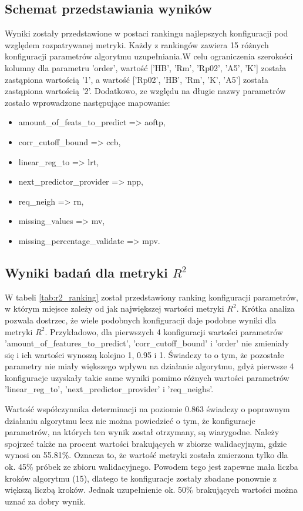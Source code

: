 \subsection{Schemat przedstawiania wyników}
Wyniki zostały przedstawione w postaci rankingu najlepszych konfiguracji pod względem rozpatrywanej metryki. Każdy z rankingów zawiera 15 różnych konfiguracji parametrów algorytmu uzupełniania.W celu ograniczenia szerokości kolumny dla parametru 'order',  wartość [’HB’, ’Rm’, ’Rp02’, ’A5’, ’K’] została zastąpiona wartością '1', a wartość  [’Rp02’, ’HB’, ’Rm’, ’K’, ’A5’] została zastąpiona wartością '2'.
Dodatkowo, ze względu na długie nazwy parametrów zostało wprowadzone następujące mapowanie:
\begin{itemize}
    \item amount\_of\_feats\_to\_predict => aoftp,
    \item corr\_cutoff\_bound => ccb,
    \item linear\_reg\_to => lrt,
    \item next\_predictor\_provider => npp,
    \item req\_neigh => rn,
    \item missing\_values => mv,
    \item missing\_percentage\_validate => mpv.
\end{itemize}

\subsection{\texorpdfstring{Wyniki badań dla metryki $R^{2}$}{Wyniki badań dla metryki R2}}
W tabeli \ref{tab:r2_ranking} został przedstawiony ranking konfiguracji parametrów, w którym miejsce zależy od jak największej wartości metryki $R^{2}$. Krótka analiza pozwala dostrzec, że wiele podobnych konfiguracji daje podobne wyniki dla metryki $R^{2}$. Przykładowo, dla pierwszych 4 konfiguracji wartości parametrów 'amount\_of\_features\_to\_predict', 'corr\_cutoff\_bound' i 'order' nie zmieniały się i ich wartości wynoszą kolejno 1, 0.95 i 1. Świadczy to o tym, że pozostałe parametry nie miały większego wpływu na działanie algorytmu, gdyż pierwsze 4 konfiguracje uzyskały takie same wyniki pomimo różnych wartości parametrów 'linear\_reg\_to', 'next\_predictor\_provider' i 'req\_neighs'.

Wartość współczynnika determinacji na poziomie 0.863 świadczy o poprawnym działaniu algorytmu lecz nie można powiedzieć o tym, że konfiguracje parametrów, na których ten wynik został otrzymany, są wiarygodne. Należy spojrzeć także na procent wartości brakujących w zbiorze walidacyjnym, gdzie wynosi on 55.81\%. Oznacza to, że wartość metryki została zmierzona tylko dla ok. 45\% próbek ze zbioru walidacyjnego. Powodem tego jest zapewne mała liczba kroków algorytmu (15), dlatego te konfiguracje zostały zbadane ponownie z większą liczbą kroków. Jednak uzupełnienie ok. 50\% brakujących wartości można uznać za dobry wynik.

